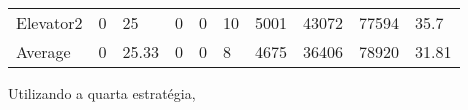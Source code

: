 \documentclass[a4paper]{article}
\begin{document}
\begin{table}[h]
\begin{tabular}{@{}llllllllll@{}}
Elevator2 & 0        & 25            & 0           & 0                                                               & 10                                                                  & 5001                                                         & 43072                                                 & 77594                                                   & 35.7         \\
Average   & 0     & 25.33         & 0        & 0                                                               & 8                                                               & 4675                                                         & 36406                                                 & 78920                                                   & 31.81          \\ \bottomrule
\end{tabular}
\end{table}

Utilizando a quarta estratégia,
\end{document}
